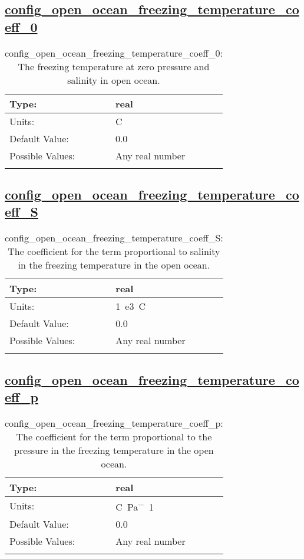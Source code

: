 \subsection[config\_open\_ocean\_freezing\_temperature\_coeff\_0]{\hyperref[sec:nm_tab_eos]{config\_open\_ocean\_freezing\_temperature\_coeff\_0}}
\label{subsec:nm_sec_config_open_ocean_freezing_temperature_coeff_0}
\begin{center}
\begin{longtable}{| p{2.0in} || p{4.0in} |}
    \hline
    Type: & real \\
    \hline
    Units: & \si{C} \\
    \hline
    Default Value: & 0.0 \\
    \hline
    Possible Values: & Any real number \\
    \hline
    \caption{config\_open\_ocean\_freezing\_temperature\_coeff\_0: The freezing temperature at zero pressure and salinity in open ocean.}
\end{longtable}
\end{center}
\subsection[config\_open\_ocean\_freezing\_temperature\_coeff\_S]{\hyperref[sec:nm_tab_eos]{config\_open\_ocean\_freezing\_temperature\_coeff\_S}}
\label{subsec:nm_sec_config_open_ocean_freezing_temperature_coeff_S}
\begin{center}
\begin{longtable}{| p{2.0in} || p{4.0in} |}
    \hline
    Type: & real \\
    \hline
    Units: & \si{1.e3.C} \\
    \hline
    Default Value: & 0.0 \\
    \hline
    Possible Values: & Any real number \\
    \hline
    \caption{config\_open\_ocean\_freezing\_temperature\_coeff\_S: The coefficient for the term proportional to salinity in the freezing temperature in the open ocean.}
\end{longtable}
\end{center}
\subsection[config\_open\_ocean\_freezing\_temperature\_coeff\_p]{\hyperref[sec:nm_tab_eos]{config\_open\_ocean\_freezing\_temperature\_coeff\_p}}
\label{subsec:nm_sec_config_open_ocean_freezing_temperature_coeff_p}
\begin{center}
\begin{longtable}{| p{2.0in} || p{4.0in} |}
    \hline
    Type: & real \\
    \hline
    Units: & \si{C.Pa^-1} \\
    \hline
    Default Value: & 0.0 \\
    \hline
    Possible Values: & Any real number \\
    \hline
    \caption{config\_open\_ocean\_freezing\_temperature\_coeff\_p: The coefficient for the term proportional to the pressure in the freezing temperature in the open ocean.}
\end{longtable}
\end{center}
